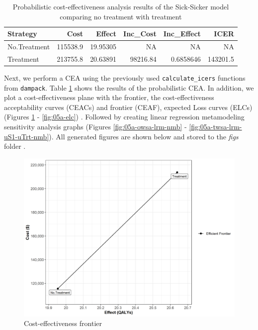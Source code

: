 \documentclass[]{book}
\begin{document}
\begin{table}[!h]

\caption{\label{tab:df-cea-prob}Probabilistic cost-effectiveness analysis results of the Sick-Sicker model comparing no treatment with treatment}
\centering
\begin{tabular}{l|r|r|r|r|r}
\hline
Strategy & Cost & Effect & Inc\_Cost & Inc\_Effect & ICER\\
\hline
No.Treatment & 115538.9 & 19.95305 & NA & NA & NA\\
\hline
Treatment & 213755.8 & 20.63891 & 98216.84 & 0.6858646 & 143201.5\\
\hline
\end{tabular}
\end{table}

Next, we perform a CEA using the previously used
\texttt{calculate\_icers} functions from \texttt{dampack}. Table
\ref{tab:df-cea-prob} shows the results of the probabilistic CEA. In
addition, we plot a cost-effectiveness plane with the frontier, the
cost-effectiveness acceptability curves (CEACs) and frontier (CEAF),
expected Loss curves (ELCs) (Figures \ref{fig:05a-cea-frontier-psa} -
\ref{fig:05a-elc}) \citep{Alarid-Escudero2019}. Followed by creating
linear regression metamodeling sensitivity analysis graphs (Figures
\ref{fig:05a-owsa-lrm-nmb} -
\ref{fig:05a-twsa-lrm-uS1-uTrt-nmb})\citep{Jalal2013}. All generated
figures are shown below and stored to the \emph{figs} folder .

\begin{figure}

{\centering \includegraphics[width=1\linewidth]{../figs/05a_cea_frontier_psa} 

}

\caption{Cost-effectiveness frontier}\label{fig:05a-cea-frontier-psa}
\end{figure}
\end{document}

